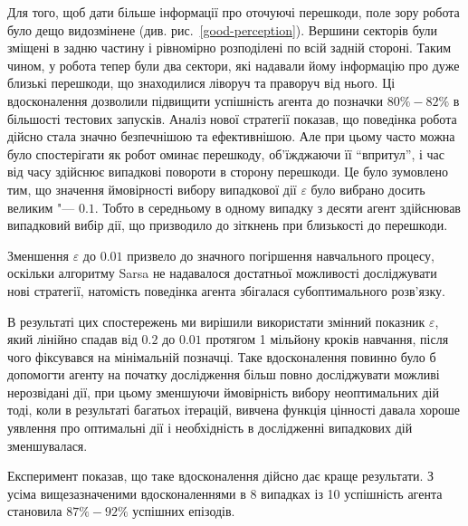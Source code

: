 \documentclass[a4paper,10pt,fleqn]{article}
\begin{document}
Для того, щоб дати більше інформації про оточуючі перешкоди, поле зору робота було дещо видозмінене (див. рис.~\ref{good-perception}). Вершини секторів були зміщені в задню частину і рівномірно розподілені по всій задній стороні. Таким чином, у робота тепер були два сектори, які надавали йому інформацію про дуже близькі перешкоди, що знаходилися ліворуч та праворуч від нього. Ці вдосконалення дозволили підвищити успішність агента до позначки $80\%-82\%$ в більшості тестових запусків. Аналіз нової стратегії показав, що поведінка робота дійсно стала значно безпечнішою та ефективнішою. Але при цьому часто можна було спостерігати як робот оминає перешкоду, об'їжджаючи її ``впритул'', і час від часу здійснює випадкові повороти в сторону перешкоди. Це було зумовлено тим, що значення ймовірності вибору випадкової дії $\varepsilon$ було вибрано досить великим "--- $0.1$. Тобто в середньому в одному випадку з десяти агент здійснював випадковий вибір дії, що призводило до зіткнень при близькості до перешкоди.

Зменшення $\varepsilon$ до $0.01$ призвело до значного погіршення навчального процесу, оскільки алгоритму Sarsa не надавалося достатньої можливості досліджувати нові стратегії, натомість поведінка агента збігалася субоптимального розв'язку.

В результаті цих спостережень ми вирішили використати змінний показник $\varepsilon$, який лінійно спадав від $0.2$ до $0.01$ протягом 1 мільйону кроків навчання, після чого фіксувався на мінімальній позначці. Таке вдосконалення повинно було б допомогти агенту на початку дослідження більш повно досліджувати можливі нерозвідані дії, при цьому зменшуючи ймовірність вибору неоптимальних дій тоді, коли в результаті багатьох ітерацій, вивчена функція цінності давала хороше уявлення про оптимальні дії і необхідність в дослідженні випадкових дій зменшувалася.

Експеримент показав, що таке вдосконалення дійсно дає краще результати. З усіма вищезазначеними вдосконаленнями в 8 випадках із 10 успішність агента становила $87\%-92\%$ успішних епізодів.
\end{document}
